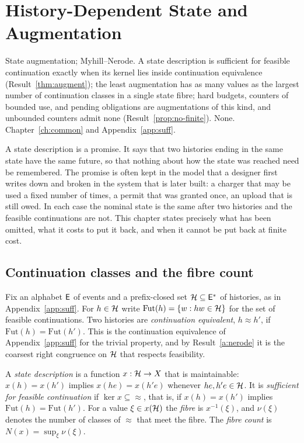 \chapter{History-Dependent State and Augmentation}\label{ch:history-state}
{State augmentation; Myhill--Nerode.}
{A state description is sufficient for feasible continuation exactly when its kernel lies inside continuation equivalence (Result~\ref{thm:augment}); the least augmentation has as many values as the largest number of continuation classes in a single state fibre; hard budgets, counters of bounded use, and pending obligations are augmentations of this kind, and unbounded counters admit none (Result~\ref{prop:no-finite}).}
{None.}
{Chapter~\ref{ch:common} and Appendix~\ref{app:suff}.}

A state description is a promise. It says that two histories ending in the same state have the same future, so that nothing about how the state was reached need be remembered. The promise is often kept in the model that a designer first writes down and broken in the system that is later built: a charger that may be used a fixed number of times, a permit that was granted once, an upload that is still owed. In each case the nominal state is the same after two histories and the feasible continuations are not. This chapter states precisely what has been omitted, what it costs to put it back, and when it cannot be put back at finite cost.

\section{Continuation classes and the fibre count}

Fix an alphabet $\mathsf{E}$ of events and a prefix-closed set $\mathcal{H}\subseteq\mathsf{E}^{*}$ of histories, as in Appendix~\ref{app:suff}. For $h\in\mathcal{H}$ write $\mathrm{Fut}(h)=\{w:hw\in\mathcal{H}\}$ for the set of feasible continuations. Two histories are \emph{continuation equivalent}, $h\approx h'$, if $\mathrm{Fut}(h)=\mathrm{Fut}(h')$. This is the continuation equivalence of Appendix~\ref{app:suff} for the trivial property, and by Result~\ref{a:nerode} it is the coarsest right congruence on $\mathcal{H}$ that respects feasibility.

A \emph{state description} is a function $x:\mathcal{H}\to X$ that is maintainable: $x(h)=x(h')$ implies $x(he)=x(h'e)$ whenever $he,h'e\in\mathcal{H}$. It is \emph{sufficient for feasible continuation} if $\ker x\subseteq{\approx}$, that is, if $x(h)=x(h')$ implies $\mathrm{Fut}(h)=\mathrm{Fut}(h')$. For a value $\xi\in x(\mathcal{H})$ the \emph{fibre} is $x^{-1}(\xi)$, and $\nu(\xi)$ denotes the number of classes of $\approx$ that meet the fibre. The \emph{fibre count} is $N(x)=\sup_\xi\nu(\xi)$.


